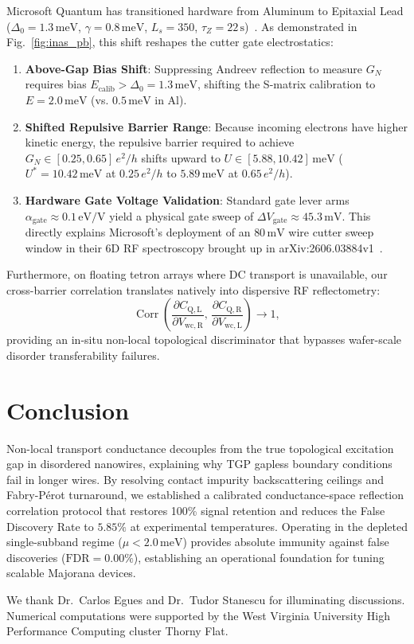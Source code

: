 \documentclass[aps,prb,reprint,superscriptaddress,amsmath,amssymb,floatfix]{revtex4-2}
\begin{document}
Microsoft Quantum has transitioned hardware from Aluminum to Epitaxial Lead ($\Delta_0 = 1.3\,\mathrm{meV}$, $\gamma = 0.8\,\mathrm{meV}$, $L_s = 350$, $\tau_Z = 22\,\text{s}$)~\cite{Aghaee2026}. As demonstrated in Fig.~\ref{fig:inas_pb}, this shift reshapes the cutter gate electrostatics:
\begin{enumerate}
    \item \textbf{Above-Gap Bias Shift}: Suppressing Andreev reflection to measure $G_N$ requires bias $E_{\mathrm{calib}} > \Delta_0 = 1.3\,\mathrm{meV}$, shifting the S-matrix calibration to $E = 2.0\,\mathrm{meV}$ (vs. $0.5\,\mathrm{meV}$ in Al).
    \item \textbf{Shifted Repulsive Barrier Range}: Because incoming electrons have higher kinetic energy, the repulsive barrier required to achieve $G_N \in [0.25, 0.65]\,e^2/h$ shifts upward to $U \in [5.88, 10.42]\,\mathrm{meV}$ ($U^* = 10.42\,\mathrm{meV}$ at $0.25\,e^2/h$ to $5.89\,\mathrm{meV}$ at $0.65\,e^2/h$).
    \item \textbf{Hardware Gate Voltage Validation}: Standard gate lever arms $\alpha_{\mathrm{gate}} \approx 0.1\,\mathrm{eV/V}$ yield a physical gate sweep of $\Delta V_{\mathrm{gate}} \approx 45.3\,\mathrm{mV}$. This directly explains Microsoft's deployment of an $80\,\mathrm{mV}$ wire cutter sweep window in their 6D RF spectroscopy brought up in arXiv:2606.03884v1~\cite{Aghaee2026}.
\end{enumerate}

Furthermore, on floating tetron arrays where DC transport is unavailable, our cross-barrier correlation translates natively into dispersive RF reflectometry:
\begin{equation}
\operatorname{Corr}\left(\frac{\partial C_{\mathrm{Q, L}}}{\partial V_{\mathrm{wc, R}}}, \, \frac{\partial C_{\mathrm{Q, R}}}{\partial V_{\mathrm{wc, L}}}\right) \longrightarrow 1,
\end{equation}
providing an in-situ non-local topological discriminator that bypasses wafer-scale disorder transferability failures.

\section{Conclusion}

Non-local transport conductance decouples from the true topological excitation gap in disordered nanowires, explaining why TGP gapless boundary conditions fail in longer wires. By resolving contact impurity backscattering ceilings and Fabry-P\'erot turnaround, we established a calibrated conductance-space reflection correlation protocol that restores 100\% signal retention and reduces the False Discovery Rate to $5.85\%$ at experimental temperatures. Operating in the depleted single-subband regime ($\mu < 2.0\,\mathrm{meV}$) provides absolute immunity against false discoveries ($\text{FDR} = 0.00\%$), establishing an operational foundation for tuning scalable Majorana devices.

\begin{acknowledgments}
We thank Dr.~Carlos Egues and Dr.~Tudor Stanescu for illuminating discussions. Numerical computations were supported by the West Virginia University High Performance Computing cluster Thorny Flat.
\end{acknowledgments}


\end{document}
